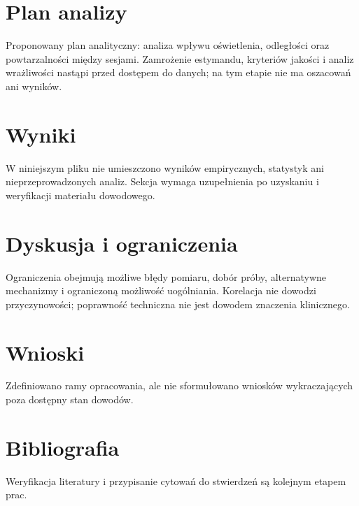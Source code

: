 \documentclass[11pt,a4paper]{article}
\begin{document}
\section{Plan analizy}

Proponowany plan analityczny: analiza wpływu oświetlenia, odległości oraz powtarzalności między sesjami. Zamrożenie estymandu, kryteriów jakości i analiz wrażliwości nastąpi przed dostępem do danych; na tym etapie nie ma oszacowań ani wyników.

\section{Wyniki}

W niniejszym pliku nie umieszczono wyników empirycznych, statystyk ani nieprzeprowadzonych analiz. Sekcja wymaga uzupełnienia po uzyskaniu i weryfikacji materiału dowodowego.

\section{Dyskusja i ograniczenia}

Ograniczenia obejmują możliwe błędy pomiaru, dobór próby, alternatywne mechanizmy i ograniczoną możliwość uogólniania. Korelacja nie dowodzi przyczynowości; poprawność techniczna nie jest dowodem znaczenia klinicznego.

\section{Wnioski}

Zdefiniowano ramy opracowania, ale nie sformułowano wniosków wykraczających poza dostępny stan dowodów.

\section*{Bibliografia}

Weryfikacja literatury i przypisanie cytowań do stwierdzeń są kolejnym etapem prac.
\end{document}
